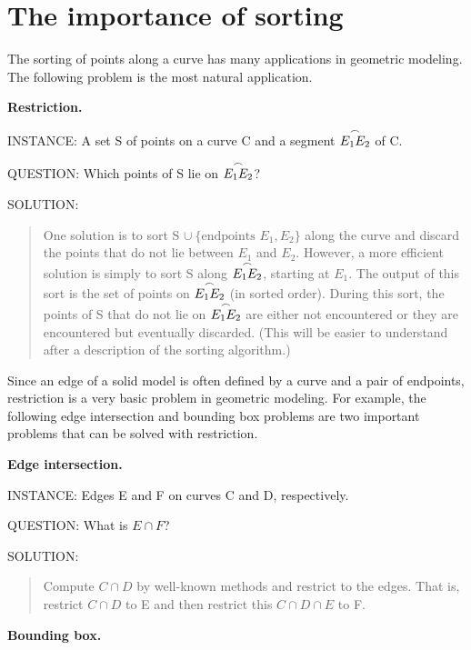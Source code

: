 \section{The importance of sorting}
The sorting of points along a curve has many applications 
in geometric modeling. 
The following problem is the most natural application.

\vspace{.2in}

{\bf Restriction.}

INSTANCE: A set S of points on a curve C and a segment $\mbox{$\stackrel{\frown}{E_{1}E_{2}}$}$ of C.

QUESTION: Which points of S lie on $\mbox{$\stackrel{\frown}{E_{1}E_{2}}$}$? 

SOLUTION: 
\begin{quote}
	One solution is to sort S $\cup\ \{\mbox{endpoints } E_{1},E_{2}\}$ along the curve
	and discard the points that do not lie between $E_{1}$ and $E_{2}$.
	However, a more efficient solution is simply to sort S along $\mbox{$\stackrel{\frown}{E_{1}E_{2}}$}$, 
	starting at $E_{1}$.  
	The output of this sort is the set of points on $\mbox{$\stackrel{\frown}{E_{1}E_{2}}$}$ (in sorted order).
	During this sort, the points of S that do not lie on $\mbox{$\stackrel{\frown}{E_{1}E_{2}}$}$ are either 
	not encountered or they are encountered but eventually discarded. 
	(This will be easier to understand after a description of the sorting algorithm.)
\end{quote}
\vspace{.25in}
Since an edge of a solid model is often defined by a curve and a pair of endpoints,
restriction is a very basic problem in geometric modeling.
For example, the following edge intersection and bounding box problems are two important 
problems that can be solved with restriction.

\vspace{.2in}

{\bf Edge intersection.}

INSTANCE: Edges E and F on curves C and D, respectively.

QUESTION: What is $E \cap F$?

{\samepage
SOLUTION: 
\begin{quote}
Compute $C \cap D$ by well-known methods and restrict to the edges.
	That is, restrict $C \cap D$ to E and then restrict this $C \cap D \cap E$ to F.
\end{quote}

}
\vspace{.2in}

{\bf Bounding box.}

